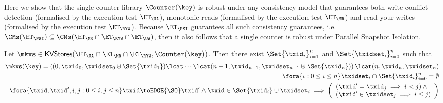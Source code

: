 Here we show that the  single counter library $\Counter(\key)$ is robust under any consistency model 
that guarantees both write conflict detection (formalised by the execution test 
$\ET_{\UA}$), monotonic reads (formalised by the execution test $\ET_{\MR}$) 
and read your writes (formalised by the execution test $\ET_{\RYW}$). 
Because $\ET_{\PSI}$ guarantees all such consistency guarantees, i.e. 
$\CMs(\ET_{\PSI}) \subseteq \CMs(\ET_{\MR} \cap \ET_{\RYW} \cap \ET_{\UA})$, 
then it also follows that a single counter is robust under Parallel Snapshot Isolation.
\begin{proposition}
\label{prop:counter_hhshape}
Let $\mkvs \in \mathsf{KVStores}(\ET_{\UA} \cap \ET_{\MR} \cap \ET_{\RYW}, \Counter(\key))$. 
Then there exist $\Set{\txid_i}_{i = 1}^{n}$ and $\Set{\txidset_{i}}_{i = 0}^{n}$ such that 
\begin{align}
\mkvs(\key) = \left( (0, \txid_{0}, \txidset_{0} \uplus \Set{\txid_1}) \lcat \cdots \lcat (n-1, \txid_{n-1}, \txidset_{n-1} \uplus \Set{\txid_{n}}) \right) 
\lcat (n, \txid_{n}, \txidset_{n}) \label{eq:psi_counter_shape}\\
\fora{ i : 0 \leq i \leq n } \txidset_{i} \cap \Set{\txid_{i}}_{i=0}^{n} = \emptyset \label{eq:psi_counter_rwtxs}\\
\fora{ \txid, \txid', i,j: 0 \leq i,j \leq n } \txid \toEDGE{\SO} \txid' 
\land \txid \in \Set{\txid_{i}} \cup \txidset_{i} \implies 
\left(\begin{array}{l}
(\txid' = \txid_{j} \implies i < j) \land {} \\
(\txid' \in \txidset_{j} \implies i \leq j) \\
\end{array}\right) \label{eq:psi_counter_so}
\end{align}
%
%
%
\end{proposition}

